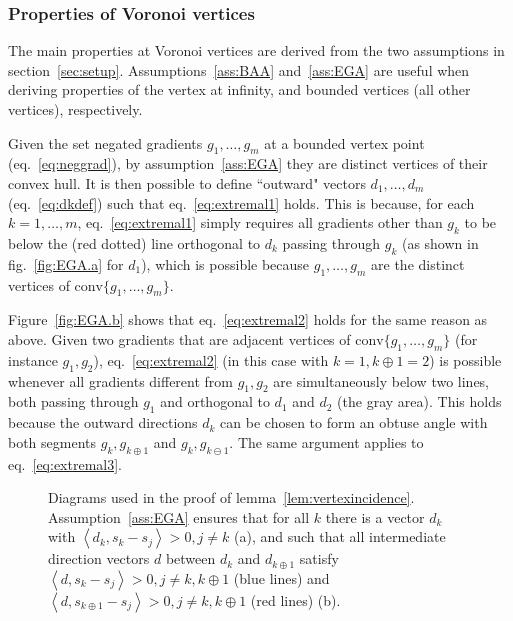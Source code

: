 \documentclass[11pt]{article}
\newcommand{\CH}[1]{\text{conv} #1 }
\begin{document}
\subsubsection{Properties of Voronoi vertices}


The main properties at Voronoi vertices are derived from the two assumptions in section~\ref{sec:setup}. 
Assumptions~\ref{ass:BAA} and~\ref{ass:EGA} are useful when deriving properties of the vertex at infinity, 
	and bounded vertices (all other vertices), respectively. 

Given the set negated gradients $g_1,\dots,g_m$ at a bounded vertex point (eq.~\ref{eq:neggrad}), 
	by assumption~\ref{ass:EGA} they are distinct vertices of their convex hull. 
It is then possible to define ``outward" vectors $d_1,\dots,d_m$ (eq.~\ref{eq:dkdef}) 
	such that eq.~\ref{eq:extremal1} holds. 
This is because, for each $k=1,\dots,m$, 
	eq.~\ref{eq:extremal1} simply requires all gradients other than $g_k$
	to be below the (red dotted) line orthogonal to $d_k$ passing through $g_k$
	(as shown in fig.~\ref{fig:EGA.a} for $d_1$), 
	which is possible because $g_1,\dots,g_m$ are the distinct vertices of $\CH\{g_1,\dots,g_m\}$.
	
Figure~\ref{fig:EGA.b} shows that eq.~\ref{eq:extremal2} holds for the same reason as above. 
Given two gradients that are adjacent vertices of $\CH\{g_1,\dots,g_m\}$
	(for instance $g_1,g_2$), 
	eq.~\ref{eq:extremal2} (in this case with $k=1, k\oplus 1=2$)
	is possible whenever all gradients different from $g_1,g_2$
	are simultaneously below two lines, both passing through $g_1$ and orthogonal to $d_1$ and $d_2$
	(the gray area). 
This holds because the outward directions $d_k$ can be chosen to form an obtuse angle with 
	both segments $g_k,g_{k\oplus 1}$ and $g_k,g_{k\ominus 1}$. 
The same argument applies to eq.~\ref{eq:extremal3}. 


\begin{figure}[htbp]
   \centering
	\quad\quad\quad
   \caption{Diagrams used in the proof of lemma~\ref{lem:vertexincidence}. 
   		Assumption~\ref{ass:EGA} ensures that for all $k$ there is a vector $d_k$ 
				with $\left<d_k,s_k-s_j\right> > 0, j\ne k$ (a), 
			and such that all intermediate direction vectors $d$ between $d_k$ and $d_{k\oplus 1}$ 
				satisfy $\left<d,s_k-s_j\right> >0, j\ne k,k\oplus 1$ (blue lines)
				and $\left<d,s_{k\oplus 1}-s_j\right> >0, j\ne k,k\oplus 1$ (red lines) (b). }
   
\end{figure}
\end{document}
